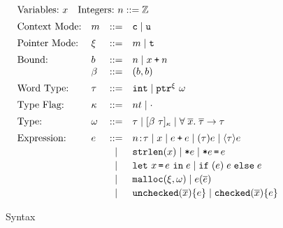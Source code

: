 \begin{figure}
  \small \centering
  \[ \hspace*{-1.2em}
\begin{array}{l}
\begin{array}{ll}
       \text{Variables:}~ x
& \text{Integers:}~n::=\mathbb{Z} 
\end{array}
\\[0.5em]

\begin{array}{llcllcl}

\text{Context Mode:} & m & ::= & \texttt{c} \mid \texttt{u} \\[0.5em]

\text{Pointer Mode:} & \xi & ::= & m \mid \texttt{t} \\[0.5em]

\text{Bound:} & b & ::= & n \mid x \mathbin{\texttt{+}} n \\
              & \beta & ::= & (b,b) \\[0.5em]
  
     \text{Word Type:}& \tau &::=& \mathtt{int}\mid \mathtt{ptr}^{ \xi}~{\omega}
\\[0.5em]

\text{Type Flag:}&\kappa &::=& nt \mid \cdot
\\[0.5em]

\text{Type:}&\omega &::=& \tau \mid [{\beta}~{\tau}]_{\kappa} \mid \forall \;\overline{x}.\;{\overline{\tau}}\to\tau
\\[0.5em]

\text{Expression:}& e & ::= & 
{n}\!:\!{\tau} \mid x \mid e \mathbin{\texttt{+}} e\mid \mathtt{(}{\tau}\mathtt{)}{e} \mid \langle{\tau}\rangle{e}  \\[0.2em]
&&\mid& \mathtt{strlen}({x}) \mid\texttt{*}{e}\mid\texttt{*}{e}\,\texttt{=}\, {e}  \\[0.2em]
&&\mid& \mathtt{let}~x\, \texttt{=}\, e~\mathtt{in}\;{e} \mid \mathtt{if\;}(e)\;{e}\;\mathtt{else}\;{e}
\\[0.2em]
&&\mid&  \mathtt{malloc}({\xi},{\omega}) \mid {e}({\overline{e}})
\\[0.2em]
&&\mid&\mathtt{unchecked}({\overline{x}})\{e\}
\mid \mathtt{checked}({\overline{x}}){\{e\}}

\end{array}
    \end{array}
  \]
  \caption{\lang Syntax}
  \label{fig:checkc-syn}
\end{figure}


